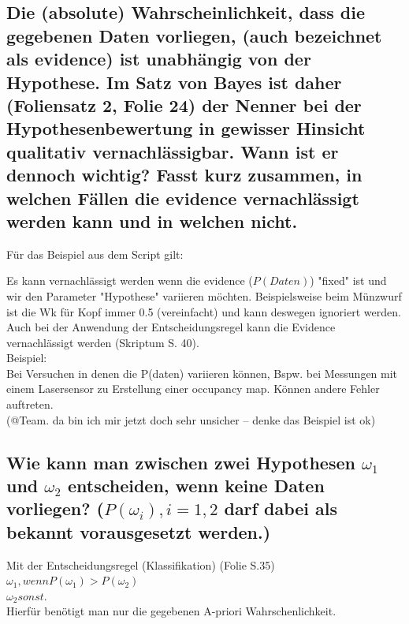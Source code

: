 \documentclass{scrartcl}
\begin{document}
\subsection{Die (absolute) Wahrscheinlichkeit, dass die gegebenen Daten vorliegen, (auch bezeichnet als evidence) ist unabhängig von der Hypothese. Im Satz von Bayes ist daher (Foliensatz 2, Folie 24) der Nenner bei der Hypothesenbewertung in gewisser Hinsicht qualitativ vernachlässigbar. Wann ist er dennoch wichtig? Fasst kurz zusammen, in welchen Fällen die evidence vernachlässigt werden kann und in welchen nicht.}
Für das Beispiel aus dem Script gilt: 

Es kann vernachlässigt werden wenn die evidence ($P(Daten)$) "fixed" ist und wir den Parameter "Hypothese" variieren möchten. Beispielsweise beim Münzwurf ist die Wk für Kopf immer 0.5 (vereinfacht) und kann deswegen ignoriert werden. Auch  bei der Anwendung der Entscheidungsregel kann die Evidence vernachlässigt werden (Skriptum S. 40).\\
Beispiel:\\Bei Versuchen in denen die P(daten) variieren können, Bspw. bei Messungen mit einem Lasersensor zu Erstellung einer occupancy map. Können andere Fehler auftreten. \\
(@Team. da bin ich mir jetzt doch sehr unsicher -- denke das Beispiel ist ok) 

\subsection{Wie kann man zwischen zwei Hypothesen $\omega_1$ und $\omega_2$ entscheiden, wenn keine Daten vorliegen? ($P(\omega_i), i=1,2$ darf dabei als bekannt vorausgesetzt werden.)}
Mit der Entscheidungsregel (Klassifikation) (Folie S.35) \\
$\omega_1, wenn P(\omega_1 ) > P(\omega_2) $ \\
$\omega_2 sonst.$\\
Hierfür benötigt man nur die gegebenen A-priori Wahrschenlichkeit. \\
\end{document}
